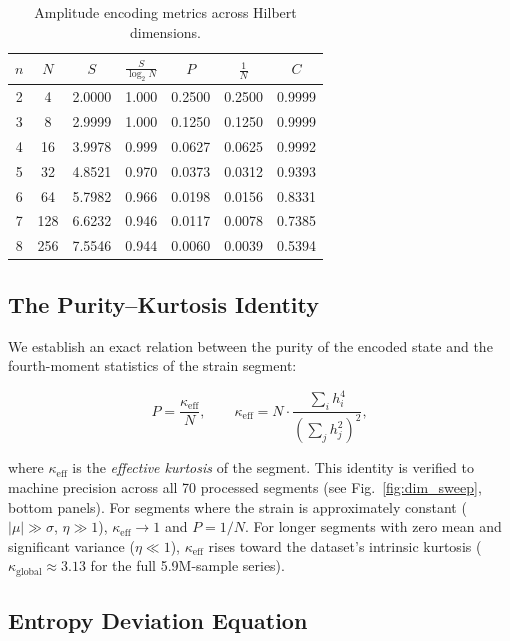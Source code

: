 \documentclass[conference]{IEEEtran}
\begin{document}
\begin{table}[h]
\centering
\caption{Amplitude encoding metrics across Hilbert dimensions.}
\label{tab:dim_sweep}
\small
\begin{tabular}{ccccccc}
\toprule
$n$ & $N$ & $S$ & $\frac{S}{\log_2 N}$ & $P$ & $\frac{1}{N}$ & $C$ \\
\midrule
2 & 4   & 2.0000 & 1.000 & 0.2500 & 0.2500 & 0.9999 \\
3 & 8   & 2.9999 & 1.000 & 0.1250 & 0.1250 & 0.9999 \\
4 & 16  & 3.9978 & 0.999 & 0.0627 & 0.0625 & 0.9992 \\
5 & 32  & 4.8521 & 0.970 & 0.0373 & 0.0312 & 0.9393 \\
6 & 64  & 5.7982 & 0.966 & 0.0198 & 0.0156 & 0.8331 \\
7 & 128 & 6.6232 & 0.946 & 0.0117 & 0.0078 & 0.7385 \\
8 & 256 & 7.5546 & 0.944 & 0.0060 & 0.0039 & 0.5394 \\
\bottomrule
\end{tabular}
\end{table}

\subsection{The Purity--Kurtosis Identity}

We establish an exact relation between the purity of the encoded state and the fourth-moment statistics of the strain segment:

\begin{equation}
\boxed{P = \frac{\kappa_{\text{eff}}}{N}}, \qquad
\kappa_{\text{eff}} = N \cdot \frac{\sum_i h_i^4}{\left(\sum_j h_j^2\right)^2},
\end{equation}

where $\kappa_{\text{eff}}$ is the \textit{effective kurtosis} of the segment. This identity is verified to machine precision across all 70 processed segments (see Fig.~\ref{fig:dim_sweep}, bottom panels). For segments where the strain is approximately constant ($|\mu| \gg \sigma$, $\eta \gg 1$), $\kappa_{\text{eff}} \to 1$ and $P = 1/N$. For longer segments with zero mean and significant variance ($\eta \ll 1$), $\kappa_{\text{eff}}$ rises toward the dataset's intrinsic kurtosis ($\kappa_{\text{global}} \approx 3.13$ for the full 5.9M-sample series).

\subsection{Entropy Deviation Equation}
\end{document}
